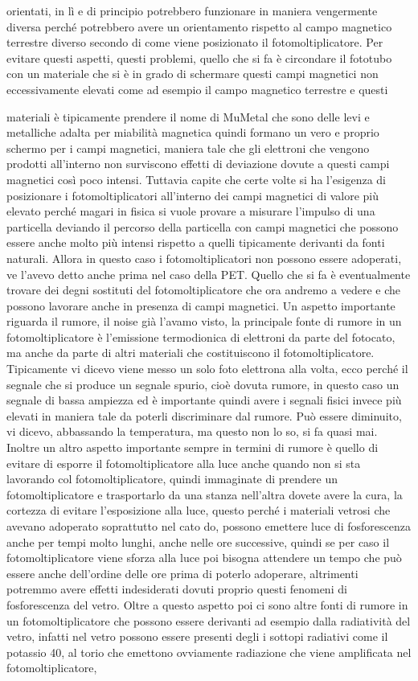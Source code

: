 orientati, in lì e di principio potrebbero funzionare in maniera vengermente diversa perché potrebbero avere un orientamento rispetto al campo magnetico terrestre diverso secondo di come viene posizionato il fotomoltiplicatore. Per evitare questi aspetti, questi problemi, quello che si fa è circondare il fototubo con un materiale che si è in grado di schermare questi campi magnetici non eccessivamente elevati come ad esempio il campo magnetico terrestre e questi

materiali è tipicamente prendere il nome di MuMetal che sono delle levi e metalliche adalta per miabilità magnetica quindi formano un vero e proprio schermo per i campi magnetici, maniera tale che gli elettroni che vengono prodotti all'interno non surviscono effetti di deviazione dovute a questi campi magnetici così poco intensi. Tuttavia capite che certe volte si ha l'esigenza di posizionare i fotomoltiplicatori all'interno dei campi magnetici di valore più elevato perché magari in fisica si vuole provare a misurare l'impulso di una particella deviando il percorso della particella con campi magnetici che possono essere anche molto più intensi rispetto a quelli tipicamente derivanti da fonti naturali. Allora in questo caso i fotomoltiplicatori non possono essere adoperati, ve l'avevo detto anche prima nel caso della PET. Quello che si fa è eventualmente trovare dei degni sostituti del fotomoltiplicatore che ora andremo a vedere e che possono lavorare anche in presenza di campi magnetici. Un aspetto importante riguarda il rumore, il noise già l'avamo visto, la principale fonte di rumore in un fotomoltiplicatore è l'emissione termodionica di elettroni da parte del fotocato, ma anche da parte di altri materiali che costituiscono il fotomoltiplicatore. Tipicamente vi dicevo viene messo un solo foto elettrona alla volta, ecco perché il segnale che si produce un segnale spurio, cioè dovuta rumore, in questo caso un segnale di bassa ampiezza ed è importante quindi avere i segnali fisici invece più elevati in maniera tale da poterli discriminare dal rumore. Può essere diminuito, vi dicevo, abbassando la temperatura, ma questo non lo so, si fa quasi mai. Inoltre un altro aspetto importante sempre in termini di rumore è quello di evitare di esporre il fotomoltiplicatore alla luce anche quando non si sta lavorando col fotomoltiplicatore, quindi immaginate di prendere un fotomoltiplicatore e trasportarlo da una stanza nell'altra dovete avere la cura, la cortezza di evitare l'esposizione alla luce, questo perché i materiali vetrosi che avevano adoperato soprattutto nel cato do, possono emettere luce di fosforescenza anche per tempi molto lunghi, anche nelle ore successive, quindi se per caso il fotomoltiplicatore viene sforza alla luce poi bisogna attendere un tempo che può essere anche dell'ordine delle ore prima di poterlo adoperare, altrimenti potremmo avere effetti indesiderati dovuti proprio questi fenomeni di fosforescenza del vetro. Oltre a questo aspetto poi ci sono altre fonti di rumore in un fotomoltiplicatore che possono essere derivanti ad esempio dalla radiatività del vetro, infatti nel vetro possono essere presenti degli i sottopi radiativi come il potassio 40, al torio che emettono ovviamente radiazione che viene amplificata nel fotomoltiplicatore, 